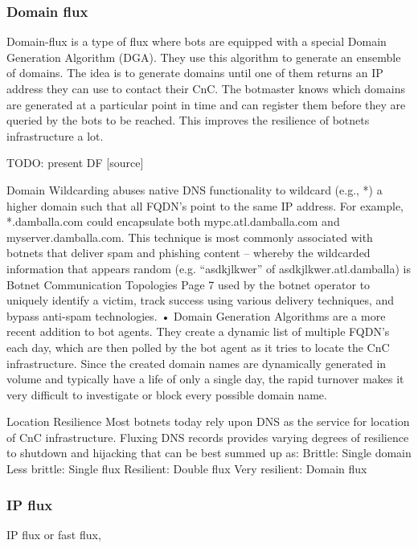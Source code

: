 \subsubsection{Domain flux}
Domain-flux is a type of flux where bots are equipped with a special Domain Generation Algorithm (DGA).
They use this algorithm to generate an ensemble of domains. The idea is to generate domains until one of them returns an IP address they can use to contact their CnC. The botmaster knows which domains are generated at a particular point in time and can register them before they are queried by
the bots to be reached. This improves the resilience of botnets infrastructure a lot.


TODO: present DF
[source]

Domain Wildcarding 
abuses native DNS functionality to wildcard (e.g., *) a
higher domain such that all FQDN’s point to the same IP address. For example,
*.damballa.com could encapsulate both mypc.atl.damballa.com and
myserver.damballa.com. This technique is most commonly associated with
botnets that deliver spam and phishing content – whereby the wildcarded
information that appears random (e.g. “asdkjlkwer” of asdkjlkwer.atl.damballa) is 
Botnet Communication Topologies
Page 7
used by the botnet operator to uniquely identify a victim, track success using
various delivery techniques, and bypass anti-spam technologies.
• Domain Generation Algorithms 
are a more recent addition to bot agents. They
create a dynamic list of multiple FQDN’s each day, which are then polled by the
bot agent as it tries to locate the CnC infrastructure. Since the created domain
names are dynamically generated in volume and typically have a life of only a
single day, the rapid turnover makes it very difficult to investigate or block every
possible domain name.

   Location Resilience
Most botnets today rely upon DNS as the service for location of CnC infrastructure.
Fluxing DNS records provides varying degrees of resilience to shutdown and hijacking
that can be best summed up as:
Brittle: Single domain
Less brittle: Single flux
Resilient: Double flux
Very resilient: Domain flux


\subsubsection{IP flux}
IP flux or fast flux, 

